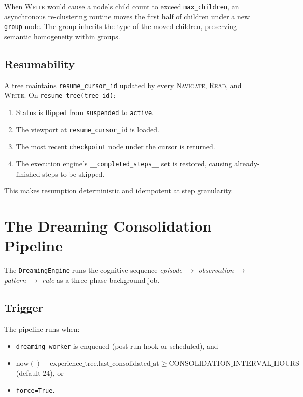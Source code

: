 \documentclass[11pt,a4paper]{article}
\theoremstyle{cortexprop}
\newcommand{\op}[1]{\textsc{#1}}
\newcommand{\code}[1]{\texttt{#1}}
\begin{document}
When \op{Write} would cause a node's child count to exceed
\code{max\_children}, an asynchronous re-clustering routine moves the
first half of children under a new \code{group} node. The group inherits
the type of the moved children, preserving semantic homogeneity within
groups.

\subsection{Resumability}

A tree maintains \code{resume\_cursor\_id} updated by every \op{Navigate},
\op{Read}, and \op{Write}. On \code{resume\_tree(tree\_id)}:

\begin{enumerate}
  \item Status is flipped from \code{suspended} to \code{active}.
  \item The viewport at \code{resume\_cursor\_id} is loaded.
  \item The most recent \code{checkpoint} node under the cursor is
  returned.
  \item The execution engine's \code{\_\_completed\_steps\_\_} set is
  restored, causing already-finished steps to be skipped.
\end{enumerate}

This makes resumption deterministic and idempotent at step granularity.

\section{The Dreaming Consolidation Pipeline}
\label{sec:dreaming}

The \code{DreamingEngine} runs the cognitive sequence \textit{episode $\to$
observation $\to$ pattern $\to$ rule} as a three-phase background job.

\subsection{Trigger}

The pipeline runs when:
\begin{itemize}
  \item \code{dreaming\_worker} is enqueued (post-run hook or scheduled),
  and
  \item $\text{now}() - \text{experience\_tree.last\_consolidated\_at}
  \geq \text{CONSOLIDATION\_INTERVAL\_HOURS}$ (default 24), or
  \item \code{force=True}.
\end{itemize}
\end{document}
